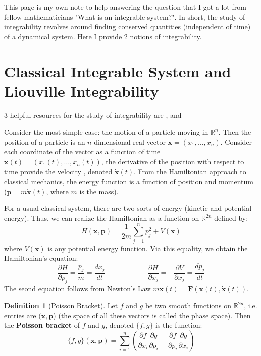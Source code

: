 \documentclass[]{article}
\theoremstyle{definition}
\newtheorem{definition}[theorem]{Definition}
\newcommand{\R}{\mathbb{R}}
\begin{document}
	
	\tableofcontents
	\vskip 1cm
	This page is my own note to help answering the question that I got a lot from fellow mathematicians "What is an integrable system?". In short, the study of integrability revolves around finding conserved quantities (independent of time) of a dynamical system. Here I provide 2 notions of integrability.  
	\section{Classical Integrable System and Liouville Integrability}
	
	3 helpful resources for the study of integrability are \cite{Suntherland}, \cite{babelon_bernard_talon_2003} and \cite{hall2013quantum}

	Consider the most simple case: the motion of a particle moving in $\R^n$. Then the position of a particle is an $n$-dimensional real vector $\textbf{x}=(x_1,\dots,x_n)$. Consider each coordinate of the vector as a function of time $\textbf{x}(t)=(x_1(t), \dots, x_n(t))$, the derivative of the position with respect to time provide the velocity , denoted $\dot{\textbf{x}}(t)$. From the Hamiltonian approach to classical mechanics, the energy function is a function of position and momentum ($\textbf{p}=m\dot{\textbf{x}}(t)$, where $m$ is the mass).
	
	For a usual classical system, there are two sorts of energy (kinetic and potential energy). Thus, we can realize the Hamiltonian as a function on $\R^{2n}$ defined by: 
	\begin{equation}
		H(\textbf{x},\textbf{p})=\frac{1}{2m}\sum_{j=1}^np_j^2+V(\textbf{x})
	\end{equation}  
	where $V(\textbf{x})$ is any potential energy function. Via this equality, we obtain the Hamiltonian's equation: 
	\begin{equation}
		\frac{\partial H}{\partial p_j}=\frac{p_j}{m}=\frac{dx_j}{dt} \hspace{2cm}
		-\frac{\partial H}{\partial x_j}=-\frac{\partial V}{\partial x_j}=\frac{dp_j}{dt}
	\end{equation}
	The seond equation follows from Newton's Law $m\ddot{\textbf{x}}(t)=\textbf{F}(\textbf{x}(t),\dot{\textbf{x}}(t))$.
	\begin{definition}[Poisson Bracket]
		Let $f$ and $g$ be two smooth functions on $\R^{2n}$, i.e. entries are $(\textbf{x}, \textbf{p}$) (the space of all these vectors is called the phase space). Then the \textbf{Poisson bracket} of $f$	and $g$, denoted $\{f,g\}$ is the function:
		\begin{equation}
			\{f,g\}(\textbf{x}, \textbf{p})=\sum_{i=1}^{n}\left(\frac{\partial f}{\partial x_i}\frac{\partial g}{\partial p_i}-\frac{\partial f}{\partial p_i}\frac{\partial g}{\partial x_i}\right)
		\end{equation}
	\end{definition}
\end{document}
